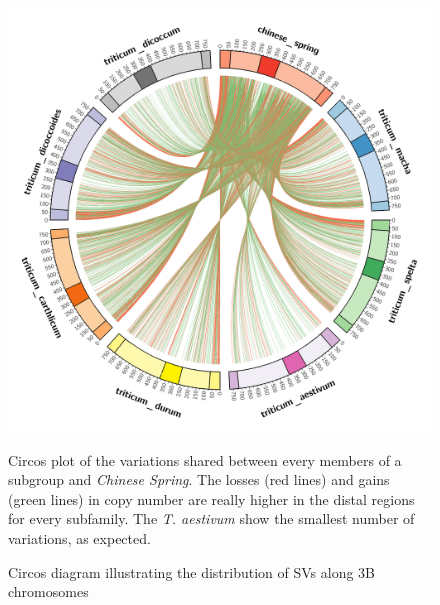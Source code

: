 \documentclass[a4paper, 12pt]{article}
\begin{document}
\begin{onehalfspace}
\newpage 
\thispagestyle{empty}
    \begin{figure}
      \centering \includegraphics[scale=0.09]{Figures/Figure_14.png}
      \vspace{0.5cm}
      \caption{Circos diagram illustrating the distribution of SVs along 3B chromosomes} 
      \label{fig:F14}
    \footnotesize{Circos plot of the variations shared between every members of a subgroup and \textit{Chinese Spring}. The losses (red lines) and gains (green lines) in copy number are really higher in the distal regions for every subfamily. The \textit{T. aestivum} show the smallest number of variations, as expected.}
    ~
    \end{figure}
    \begin{figure}
    \vspace{-0.01cm}

\end{figure}
\end{onehalfspace}
\end{document}
